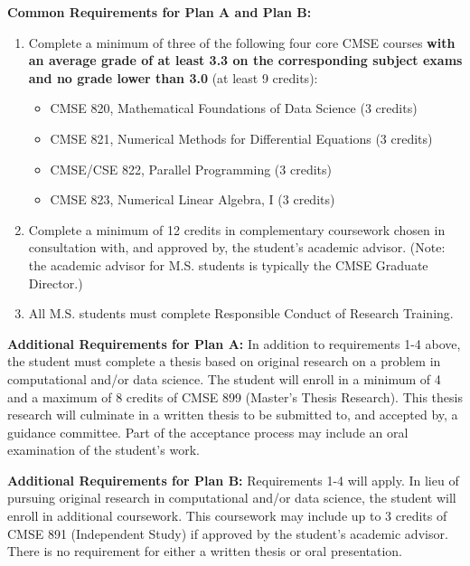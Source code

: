 \vspace{3mm}
\noindent
\textbf{Common Requirements for Plan A and Plan B:}

\begin{enumerate}

\item Complete a minimum of three of the following four core CMSE
  courses \textbf{with an average grade of at least 3.3 on the
    corresponding subject exams and no grade lower than 3.0} (at least
  9 credits):

\begin{itemize}
    \item  CMSE 820, Mathematical Foundations of Data Science (3 credits)  
    \item  CMSE 821, Numerical Methods for Differential Equations (3 credits)  
    \item  CMSE/CSE 822, Parallel Programming (3 credits)  
    \item  CMSE 823, Numerical Linear Algebra, I (3 credits)  
\end{itemize}

\item Complete a minimum of 12 credits in complementary coursework
  chosen in consultation with, and approved by, the student’s academic
  advisor.  (Note: the academic advisor for M.S. students is typically the CMSE Graduate Director.)
 
\item All M.S. students must complete Responsible Conduct of Research
  Training.
\end{enumerate}

\vspace{3mm}
\noindent
\textbf{Additional Requirements for Plan A:} In addition to
requirements 1-4 above, the student must complete a thesis based on
original research on a problem in computational and/or data
science. The student will enroll in a minimum of 4 and a maximum of 8
credits of CMSE 899 (Master’s Thesis Research). This thesis research
will culminate in a written thesis to be submitted to, and accepted
by, a guidance committee. Part of the acceptance process may include
an oral examination of the student’s work.

\vspace{3mm}
\noindent
\textbf{Additional Requirements for Plan B:} Requirements 1-4 will
apply. In lieu of pursuing original research in computational and/or
data science, the student will enroll in additional coursework. This
coursework may include up to 3 credits of CMSE 891 (Independent Study)
if approved by the student’s academic advisor. There is no requirement
for either a written thesis or oral presentation.


